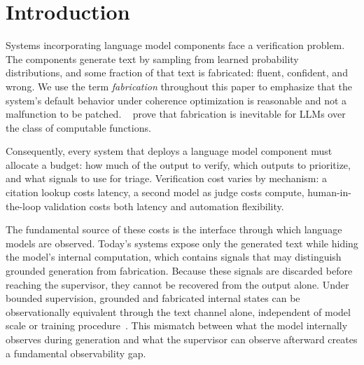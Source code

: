 \balance
\section{Introduction}\label{sec:intro}

Systems incorporating language model components face a verification problem.
The components generate text by sampling from learned probability distributions,
and some fraction of that text is fabricated: fluent, confident, and wrong.
We use the term \emph{fabrication} throughout this paper to emphasize that
the system's default behavior under coherence optimization is reasonable and
not a malfunction to be patched.
\citeauthor{xu2024hallucination}~\cite{xu2024hallucination} prove that fabrication is
inevitable for LLMs over the class of computable functions.



Consequently, every system that
deploys a language model component must allocate a budget: how much of the output to verify,
which outputs to prioritize, and what signals to use for triage.
Verification cost varies by mechanism: a citation lookup costs latency,
a second model as judge costs compute, human-in-the-loop validation
costs both latency and automation flexibility.

The fundamental source of these costs is the interface through which language models are observed.
Today's systems expose only the generated text while hiding the model's internal computation,
which contains signals that may distinguish grounded generation from fabrication.
Because these signals are discarded before reaching the supervisor, they cannot be recovered from the output alone.
Under bounded supervision,
grounded and fabricated internal states can be observationally equivalent through the text channel alone,
independent of model scale or training procedure~\cite{mason2026epistemic}.
This mismatch between what the model internally observes during generation
and what the supervisor can observe afterward creates a fundamental observability gap.

